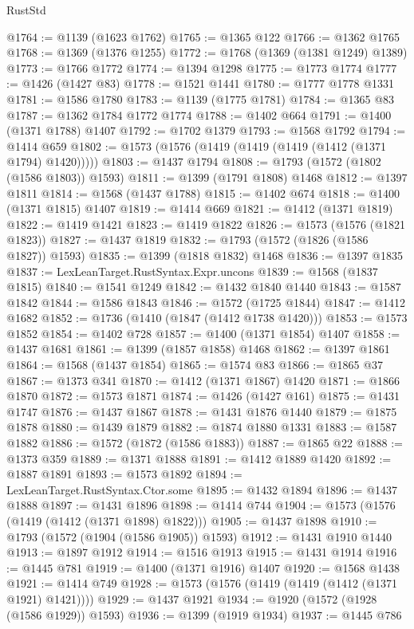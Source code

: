 \begin{lexlean}{RustStd}
\begin{coremodule}
@1764 := @1139 (@1623 @1762)
@1765 := @1365 @122
@1766 := @1362 @1765
@1768 := @1369 (@1376 @1255)
@1772 := @1768 (@1369 (@1381 @1249) @1389)
@1773 := @1766 @1772
@1774 := @1394 @1298
@1775 := @1773 @1774
@1777 := @1426 (@1427 @83)
@1778 := @1521 @1441
@1780 := @1777 @1778 @1331
@1781 := @1586 @1780
@1783 := @1139 (@1775 @1781)
@1784 := @1365 @83
@1787 := @1362 @1784 @1772 @1774
@1788 := @1402 @664
@1791 := @1400 (@1371 @1788) @1407
@1792 := @1702 @1379
@1793 := @1568 @1792
@1794 := @1414 @659
@1802 := @1573 (@1576 (@1419 (@1419 (@1419 (@1412 (@1371 @1794) @1420)))))
@1803 := @1437 @1794
@1808 := @1793 (@1572 (@1802 (@1586 @1803)) @1593)
@1811 := @1399 (@1791 @1808) @1468
@1812 := @1397 @1811
@1814 := @1568 (@1437 @1788)
@1815 := @1402 @674
@1818 := @1400 (@1371 @1815) @1407
@1819 := @1414 @669
@1821 := @1412 (@1371 @1819)
@1822 := @1419 @1421
@1823 := @1419 @1822
@1826 := @1573 (@1576 (@1821 @1823))
@1827 := @1437 @1819
@1832 := @1793 (@1572 (@1826 (@1586 @1827)) @1593)
@1835 := @1399 (@1818 @1832) @1468
@1836 := @1397 @1835
@1837 := LexLeanTarget.RustSyntax.Expr.uncons
@1839 := @1568 (@1837 @1815)
@1840 := @1541 @1249
@1842 := @1432 @1840 @1440
@1843 := @1587 @1842
@1844 := @1586 @1843
@1846 := @1572 (@1725 @1844)
@1847 := @1412 @1682
@1852 := @1736 (@1410 (@1847 (@1412 @1738 @1420)))
@1853 := @1573 @1852
@1854 := @1402 @728
@1857 := @1400 (@1371 @1854) @1407
@1858 := @1437 @1681
@1861 := @1399 (@1857 @1858) @1468
@1862 := @1397 @1861
@1864 := @1568 (@1437 @1854)
@1865 := @1574 @83
@1866 := @1865 @37
@1867 := @1373 @341
@1870 := @1412 (@1371 @1867) @1420
@1871 := @1866 @1870
@1872 := @1573 @1871
@1874 := @1426 (@1427 @161)
@1875 := @1431 @1747
@1876 := @1437 @1867
@1878 := @1431 @1876 @1440
@1879 := @1875 @1878
@1880 := @1439 @1879
@1882 := @1874 @1880 @1331
@1883 := @1587 @1882
@1886 := @1572 (@1872 (@1586 @1883))
@1887 := @1865 @22
@1888 := @1373 @359
@1889 := @1371 @1888
@1891 := @1412 @1889 @1420
@1892 := @1887 @1891
@1893 := @1573 @1892
@1894 := LexLeanTarget.RustSyntax.Ctor.some
@1895 := @1432 @1894
@1896 := @1437 @1888
@1897 := @1431 @1896
@1898 := @1414 @744
@1904 := @1573 (@1576 (@1419 (@1412 (@1371 @1898) @1822)))
@1905 := @1437 @1898
@1910 := @1793 (@1572 (@1904 (@1586 @1905)) @1593)
@1912 := @1431 @1910 @1440
@1913 := @1897 @1912
@1914 := @1516 @1913
@1915 := @1431 @1914
@1916 := @1445 @781
@1919 := @1400 (@1371 @1916) @1407
@1920 := @1568 @1438
@1921 := @1414 @749
@1928 := @1573 (@1576 (@1419 (@1419 (@1412 (@1371 @1921) @1421))))
@1929 := @1437 @1921
@1934 := @1920 (@1572 (@1928 (@1586 @1929)) @1593)
@1936 := @1399 (@1919 @1934)
@1937 := @1445 @786

\end{coremodule}
\end{lexlean}
